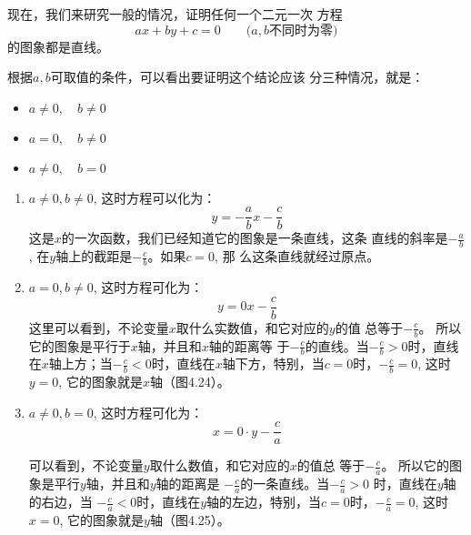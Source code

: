现在，我们来研究一般的情况，证明任何一个二元一次
方程
\[ax+by+c=0\qquad  \text{($a,b$不同时为零)}\]
的图象都是直线。

根据$a,b$可取值的条件，可以看出要证明这个结论应该
分三种情况，就是：
\begin{itemize}
    \item $a\ne 0,\quad b\ne 0$
    \item $a=0,\quad b\ne 0$
    \item $a\ne 0,\quad  b=0$
\end{itemize}

\begin{enumerate}
    \item $a\ne 0,b\ne 0$, 这时方程可以化为：
    \begin{equation}
        y=-\frac{a}{b}x-\frac{c}{b}
    \end{equation}
这是$x$的一次函数，我们已经知道它的图象是一条直线，这条
直线的斜率是$-\frac{a}{b}$,
在$y$轴上的截距是$-\frac{c}{b}$。如果$c=0$, 那
么这条直线就经过原点。

\item $a=0,b\ne 0$, 这时方程可化为：
\begin{equation}
    y=0x-\frac{c}{b}
\end{equation}
这里可以看到，不论变量$x$取什么实数值，和它对应的$y$的值
总等于$-\frac{c}{b}$。
所以它的图象是平行于$x$轴，并且和$x$轴的距离等
于$-\frac{c}{b}$的直线。当$-\frac{c}{b}>0$时，直线在$x$轴上方；当$-\frac{c}{b}<0$时，直线在$x$轴下方，特别，当$c=0$时，$-\frac{c}{b}=0$, 这时
$y=0$, 它的图象就是$x$轴（图4.24）。

\item $a\ne 0,b=0$, 这时方程可化为：
\begin{equation}
    x=0\cdot y-\frac{c}{a}
\end{equation}

可以看到，不论变量$y$取什么数值，和它对应的$x$的值总
等于$-\frac{c}{a}$。
所以它的图象是平行$y$轴，并且和$y$轴的距离是
$-\frac{c}{a}$的一条直线。当$-\frac{c}{a}>0$
时，直线在$y$轴的右边，当
$-\frac{c}{a}<0$时，直线在$y$轴的左边，特别，当$c=0$时，$-\frac{c}{a}=0$,
这时$x=0$, 它的图象就是$y$轴（图4.25）。


\end{enumerate}
